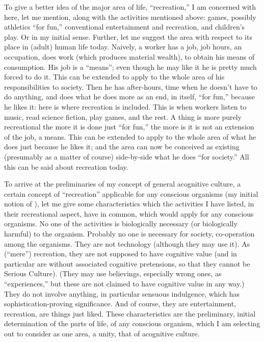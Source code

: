 To give a better idea of the major area of life, \enquote{recreation,} I am concerned with here, let me mention, along with the activities mentioned above: games, possibly athletics \enquote{for fun,} conventional entertainment and recreation, and children's play. Or  in my initial sense. Further, let me suggest the area with respect to its place in (adult) human life today. Naively, a worker has a job, job hours, an occupation, does work (which produces material wealth), to obtain his means of consumption. His job is a \enquote{means}; even though he may like it he is pretty much forced to do it. This can be extended to apply to the whole area of his responsibilities to society. Then he has after-hours, time when he doesn't have to do anything, and does what he does more as an end, in itself, \enquote{for fun,} because he likes it: here is where recreation is included. This is when workers listen to music, read science fiction, play games, and the rest. A thing is more purely recreational the more it is done just \enquote{for fun,} the more is it is not an extension of the job, a means. This can be extended to apply to the whole area of what he does just because he likes it; and the area can now be conceived as existing (presumably as a matter of course) side-by-side what he does \enquote{for society.} All this can be said about recreation today.

To arrive at the preliminaries of my concept of general acognitive culture, a certain concept of \enquote{recreation} applicable for any conscious organisms (my initial notion of ), let me give some characteristics which the activities I have listed, in their recreational aspect, have in common, which would apply for any conscious organisms. No one of the activities is biologically necessary (or biologically harmful) to the organism. Probably no one is necessary for society, co-operation among the organisms. They are not technology (although they may use it). As (\enquote{mere}) recreation, they are not supposed to have cognitive value (and in particular are without associated cognitive pretensions, so that they cannot be Serious Culture). (They may use believings, especially wrong ones, as \enquote{experiences,} but these are not claimed to have cognitive value in any way.) They do not involve anything, in particular sensuous indulgence, which has sophistication-proving significance. And of course, they are entertainment, recreation, are things just liked. These characteristics are the preliminary, initial determination of the parts of life, of any conscious organism, which I am selecting out to consider as one area, a unity, that of acognitive culture.

